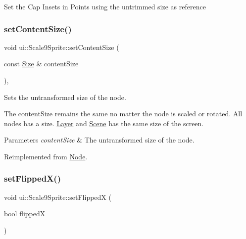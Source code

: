 Set the Cap Insets in Points using the untrimmed size as reference \mbox{\label{classui_1_1Scale9Sprite_af7a55ebc4ba4b0da9ce2ce34bb3bda37}} 
\subsubsection{\texorpdfstring{set\+Content\+Size()}{setContentSize()}}
{\footnotesize\ttfamily void ui\+::\+Scale9\+Sprite\+::set\+Content\+Size (\begin{DoxyParamCaption}\item[{const \hyperlink{classSize}{Size} \&}]{content\+Size }\end{DoxyParamCaption})\hspace{0.3cm}{\ttfamily [override]}, {\ttfamily [virtual]}}

Sets the untransformed size of the node.

The content\+Size remains the same no matter the node is scaled or rotated. All nodes has a size. \hyperlink{classLayer}{Layer} and \hyperlink{classScene}{Scene} has the same size of the screen.


\begin{DoxyParams}{Parameters}
{\em content\+Size} & The untransformed size of the node. \\
\hline
\end{DoxyParams}


Reimplemented from \hyperlink{classNode_ade113d7fc9244f58ac98a4712da49818}{Node}.

\mbox{\label{classui_1_1Scale9Sprite_a54fac90f2430df7598c90fa46c05b39c}} 
\subsubsection{\texorpdfstring{set\+Flipped\+X()}{setFlippedX()}}
{\footnotesize\ttfamily void ui\+::\+Scale9\+Sprite\+::set\+FlippedX (\begin{DoxyParamCaption}\item[{bool}]{flippedX }\end{DoxyParamCaption})\hspace{0.3cm}{\ttfamily [virtual]}}

